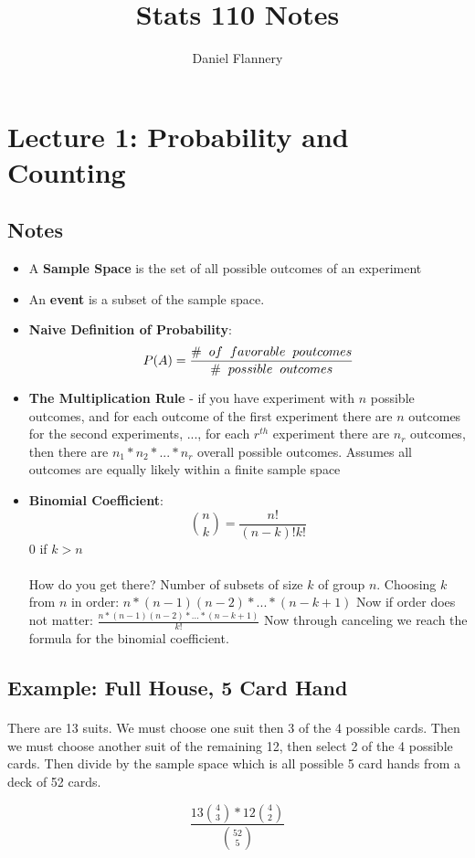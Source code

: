 \documentclass[11pt, oneside]{article}   	%
\title{Stats 110 Notes}
\author{Daniel Flannery}
\begin{document}
\maketitle
\section{Lecture 1: Probability and Counting}					%
	\subsection{Notes}
	\begin{itemize}
		\item A \textbf{Sample Space} is the set of all possible outcomes of an experiment
		\item An \textbf{event} is a subset of the sample space.
		\item \textbf{Naive Definition of Probability}: \[P(A) = \frac{\# \hspace{2mm} of \hspace{2mm} favorable \hspace{2mm}p outcomes}{\# \hspace{2mm} possible \hspace{2mm} outcomes}\]
		\item \textbf{The Multiplication Rule} - if you have experiment with $n$ possible outcomes, and for each outcome of the first experiment there 		are $n$ outcomes for the second experiments, ..., for each $r^{th}$ experiment there are $n_{r}$ outcomes, then there are $n_{1}*n_{2}*...*n_{r}$ overall possible outcomes.
		Assumes all outcomes are equally likely within a finite sample space
		\item \textbf{Binomial Coefficient}: \[ \binom{n}{k} = \frac{n!}{(n-k)!k!} \] $0$ if $k > n$\\
		\\
		How do you get there?
		Number of subsets of size $k$ of group $n$. Choosing $k$ from $n$ in order: $n*(n-1)(n-2)*...*(n-k+1)$
		Now if order does not matter: $\frac{n*(n-1)(n-2)*...*(n-k+1)}{k!}$
		Now through canceling we reach the formula for the binomial coefficient.
		\end{itemize}
	\subsection{Example: Full House, 5 Card Hand}
		\paragraph{}
			There are 13 suits. We must choose one suit then 3 of the 4 possible cards. Then we must choose another suit of the remaining 12, then select 2 of the 4 possible cards. Then divide by the sample space which is all possible 5 card hands from a deck of 52 cards.
		\begin{center}
			\[ \frac{13\binom{4}{3} * 12\binom{4}{2}}{\binom{52}{5}} \]
		\end{center}
\end{document}

